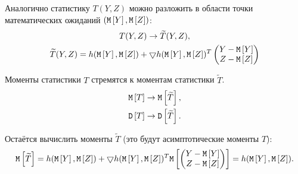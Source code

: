 Аналогично статистику $T(Y,Z)$  можно разложить в области точки математических ожиданий $\left ( \mathtt{M} \left [ Y \right ], \mathtt{M} \left [ Z \right ] \right )$:
\begin{gather}
    T(Y, Z) \rightarrow \widetilde{T}(Y, Z) , \\
    \widetilde{T}(Y, Z) = h( \mathtt{M} \left [ Y \right ], \mathtt{M} \left [ Z \right ] ) + \bigtriangledown h(\mathtt{M} \left [ Y \right ], \mathtt{M} \left [ Z \right ])^T \begin{pmatrix}
                                                                                                                             Y - \mathtt{M} \left [ Y \right ] \\ Z - \mathtt{M} \left [ Z \right ]
    \end{pmatrix}
\end{gather}

Моменты статистики $T$ стремятся к моментам статистики $\widetilde{T}$.
\begin{gather}
    \mathtt{M} \left [ T \right ] \rightarrow \mathtt{M} \left [ \widetilde{T} \right ] , \\
    \mathtt{D} \left [ T \right ] \rightarrow \mathtt{D} \left [ \widetilde{T} \right ] .
\end{gather}

Остаётся вычислить моменты $\widetilde{T}$ (это будут асимптотические моменты $T$):
\begin{equation}
    \mathtt{M} \left [ \widetilde{T} \right ] =
    h( \mathtt{M} \left [ Y \right ], \mathtt{M} \left [ Z \right ] ) + \bigtriangledown h(\mathtt{M} \left [ Y \right ], \mathtt{M} \left [ Z \right ])^T \mathtt{M} \left [  \begin{pmatrix}
                                                                                                                     Y - \mathtt{M} \left [ Y \right ] \\ Z - \mathtt{M} \left [ Z \right ]
    \end{pmatrix}  \right ]
    = h(\mathtt{M} \left [ Y \right ], \mathtt{M} \left [ Z \right ]) .
\end{equation}

